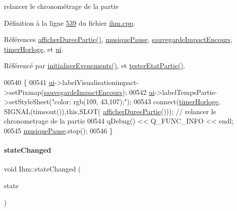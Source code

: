 relancer le chronométrage de la partie 



Définition à la ligne \hyperlink{ihm_8cpp_source_l00539}{539} du fichier \hyperlink{ihm_8cpp_source}{ihm.\+cpp}.



Références \hyperlink{ihm_8cpp_source_l00484}{afficher\+Duree\+Partie()}, \hyperlink{ihm_8h_source_l00057}{musique\+Pause}, \hyperlink{ihm_8h_source_l00060}{sauvegarde\+Impact\+Encours}, \hyperlink{ihm_8h_source_l00053}{timer\+Horloge}, et \hyperlink{ihm_8h_source_l00052}{ui}.



Référencé par \hyperlink{ihm_8cpp_source_l00075}{initialiser\+Evenements()}, et \hyperlink{ihm_8cpp_source_l00641}{tester\+Etat\+Partie()}.


\begin{DoxyCode}
00540 \{
00541     \hyperlink{class_ihm_a0ac5f47856566ceeeca1720109bf70ea}{ui}->labelVisualisationimpact->setPixmap(\hyperlink{class_ihm_a659c67bf5d1ba3104fb10f23d8b91b37}{sauvegardeImpactEncours});
00542     \hyperlink{class_ihm_a0ac5f47856566ceeeca1720109bf70ea}{ui}->labelTempsPartie->setStyleSheet(\textcolor{stringliteral}{"color: rgb(109, 43,107);"});
00543     connect(\hyperlink{class_ihm_a21ea35b212966fa2805241ea6237d351}{timerHorloge}, SIGNAL(timeout()),\textcolor{keyword}{this},SLOT(
      \hyperlink{class_ihm_a808bd550b877499a38419a492595822e}{afficherDureePartie}())); \textcolor{comment}{// relancer le chronometrage de la partie}
00544     qDebug() << Q\_FUNC\_INFO << endl;
00545     \hyperlink{class_ihm_a11e7ae529b6adb7ac98f1aa512172ff2}{musiquePause}.stop();
00546 \}
\end{DoxyCode}
\mbox{\label{class_ihm_a3c815827527ca8f9c586e001e8e95721}} 
\paragraph{\texorpdfstring{state\+Changed}{stateChanged}}
{\footnotesize\ttfamily void Ihm\+::state\+Changed (\begin{DoxyParamCaption}\item[{Q\+Media\+Player\+::\+State}]{state }\end{DoxyParamCaption})\hspace{0.3cm}{\ttfamily [slot]}}



